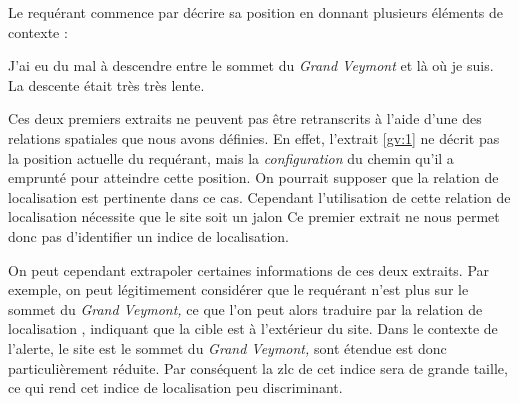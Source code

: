 Le requérant commence par décrire sa position en donnant plusieurs
éléments de contexte :
%
\begin{dialogue}
  \Req {} J'ai eu du mal à descendre entre le sommet du
  \emph{Grand Veymont} et là où je suis.  La descente
  était très très lente.
\end{dialogue}
%
Ces deux premiers extraits ne peuvent pas être retranscrits à l'aide
d'une des relations spatiales que nous avons définies. En effet,
l'extrait \ref{gv:1} ne décrit pas la position actuelle du requérant,
mais la \emph{configuration} du chemin qu'il a emprunté pour atteindre
cette position. On pourrait supposer que la relation de localisation
 est pertinente dans ce
cas. Cependant l'utilisation de cette relation de localisation
nécessite que le site soit un jalon
%
Ce premier extrait ne nous permet donc pas d'identifier un indice de
localisation.

On peut cependant extrapoler certaines informations de ces deux
extraits. Par exemple, on peut légitimement considérer que le
requérant n'est plus sur le sommet du \emph{Grand Veymont,} ce que
l'on peut alors traduire par la relation de localisation
, indiquant que la cible est à
l'extérieur du site. Dans le contexte de l'alerte, le site est le
sommet du \emph{Grand Veymont,} sont étendue est donc particulièrement
réduite. Par conséquent la \ac{zlc} de cet indice sera de grande
taille, ce qui rend cet indice de localisation peu discriminant.

